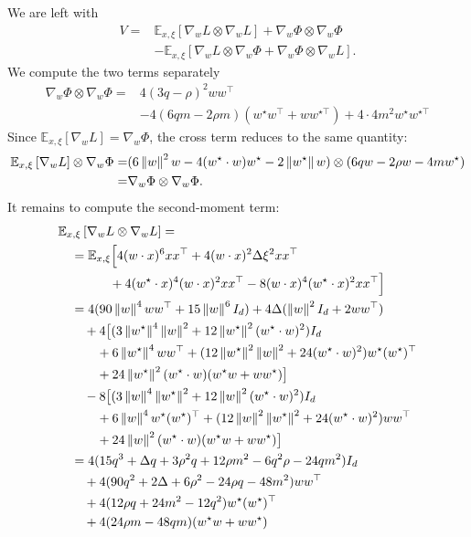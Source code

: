 We are left with
\[\begin{split}
    V ={}& \mathbb E_{x,\xi} \left[\nabla_wL\otimes\nabla_wL\right]+\nabla_w\Phi\otimes\nabla_w\Phi \\
       &- \mathbb E_{x,\xi} \left[\nabla_w L\otimes\nabla_w\Phi + \nabla_w\Phi\otimes\nabla_w L\right].
\end{split}\]
We compute the two terms separately
\[\begin{split}
    \nabla_w\Phi\otimes\nabla_w\Phi ={}& 4(3q-\rho)^2ww^\top \\
        &- 4(6qm-2\rho m)(w^\star w^{\top}+w w^{\star\top}) + 4\cdot4m^2 w^\star w^{\star\top}
\end{split}\]
Since \(\mathbb E_{x,\xi}\left[\nabla_wL\right] = \nabla_w\Phi\), the cross term reduces to the same quantity:
\[\begin{split}
    \mathbb E_{x,\xi}\left[\nabla_wL\right]\otimes\nabla_w\Phi
        =& (6\left\lVert w\right\rVert^2w-4(w^\star\cdot w) w^\star - 2 \left\lVert w^\star\right\rVert w)\otimes (6qw-2\rho w-4mw^\star) \\
        =& \nabla_w\Phi\otimes\nabla_w\Phi.
\end{split}\]
It remains to compute the second-moment term:
\[\begin{split}
    &\mathbb E_{x,\xi} \left[\nabla_wL\otimes\nabla_wL\right] = \\
        &\quad=\mathbb E_{x,\xi} \Big[4(w\cdot x )^6 xx^\top + 4 (w\cdot x)^2\Delta \xi^2 xx^\top \\
        &\qquad\qquad + 4 (w^\star\cdot x)^4 (w\cdot x)^2 xx^\top
                                -8(w\cdot x)^4(w^\star\cdot x)^2 xx^\top\Big] \\
        &\quad =4(90\left\lVert w\right\rVert^4ww^\top+15\left\lVert w\right\rVert^6I_d) + 4\Delta(\left\lVert w\right\rVert^2I_d+2ww^\top) \\
        &\qquad +4\big[(3\left\lVert w^\star\right\rVert^4\left\lVert w\right\rVert^2+12\left\lVert w^\star\right\rVert^2(w^\star\cdot w)^2)I_d \\
        &\quad\qquad +6\left\lVert w^\star\right\rVert^4ww^\top
                + (12\left\lVert w^\star\right\rVert^2\left\lVert w\right\rVert^2+24(w^\star\cdot w)^2)w^\star (w^\star)^\top\\
        &\quad\qquad +24\left\lVert w^\star\right\rVert^2(w^\star\cdot w)(w^\star w+ ww^\star)\big] \\
        &\qquad -8\big[(3\left\lVert w\right\rVert^4\left\lVert w^\star\right\rVert^2+12\left\lVert w\right\rVert^2(w^\star\cdot w)^2)I_d \\
        &\quad\qquad +6\left\lVert w\right\rVert^4w^\star(w^\star)^\top
                + (12\left\lVert w\right\rVert^2\left\lVert w^\star\right\rVert^2+24(w^\star\cdot w)^2)w w^\top \\
        &\quad\qquad +24\left\lVert w\right\rVert^2(w^\star\cdot w)(w^\star w+ ww^\star)\big] \\
        &\quad= 4(15q^3+\Delta q+3\rho^2q+12\rho m^2-6q^2\rho-24qm^2)I_d \\
        &\qquad + 4(90q^2+2\Delta+6\rho^2-24\rho q -48m^2)ww^\top \\
        &\qquad +4(12\rho q + 24m^2-12q^2)w^\star(w^\star)^\top \\
        &\qquad +4(24\rho m-48qm)(w^\star w+ ww^\star)
\end{split}\]

